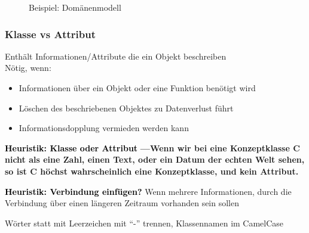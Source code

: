 \documentclass[ngerman,color=3b]{tuda_summary}
\begin{document}
\begin{figure}[ht]
    \centering
    \caption{Beispiel: Domänenmodell}
    \label{fig:domain}
\end{figure}
\clearpage
\subsubsection{Klasse vs Attribut}
\begin{definition}
    Enthält Informationen/Attribute die ein Objekt beschreiben\\
    Nötig, wenn:\begin{itemize}
        \item Informationen über ein Objekt oder eine Funktion benötigt wird
        \item Löschen des beschriebenen Objektes zu Datenverlust führt
        \item Informationsdopplung vermieden werden kann
    \end{itemize}
\end{definition}
\begin{defBox}
    \small\textcolor{black}{\sffamily\bfseries Heuristik: Klasse oder Attribut} \space\sffamily\bfseries\color{black}---\normalfont\normalsize\space Wenn wir bei eine Konzeptklasse C nicht als eine Zahl, einen Text, oder ein Datum der echten Welt sehen, so ist C höchst wahrscheinlich eine Konzeptklasse, und kein Attribut.
\end{defBox}
\begin{defBox}
    \small\textcolor{black}{\sffamily\bfseries Heuristik: Verbindung einfügen?} Wenn mehrere Informationen, durch die Verbindung über einen längeren Zeitraum vorhanden sein sollen
\end{defBox}
\begin{definition}
    Wörter statt mit Leerzeichen mit "`-"' trennen, Klassennamen im CamelCase
\end{definition}
\end{document}
